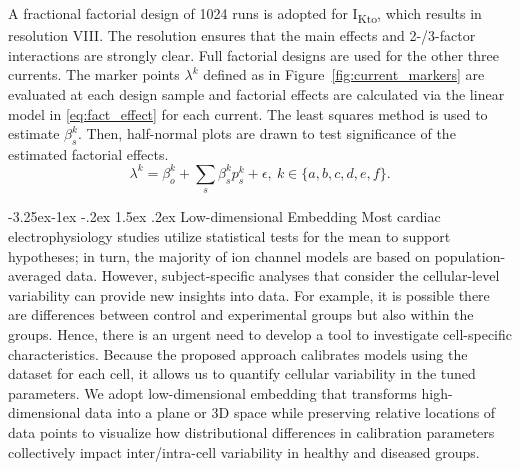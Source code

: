 \documentclass[11pt]{article}
\makeatletter
\renewcommand\subsection{\@startsection{subsection}{2}{\z@}%
                                     {-3.25ex\@plus -1ex \@minus -.2ex}%
                                     {1.5ex \@plus .2ex}%
                                     {\normalfont\fontfamily{phv}\fontsize{14}{17}\bfseries}}
\makeatother
\begin{document}
A fractional factorial design of 1024 runs is adopted for I\textsubscript{Kto}, which results in resolution VIII. The resolution ensures that the main effects and 2-/3-factor interactions are strongly clear. Full factorial designs are used for the other three currents. The marker points $\lambda^{k}$ defined as in Figure~\ref{fig:current_markers} are evaluated at each design sample and factorial effects are calculated via the linear model in \eqref{eq:fact_effect} for each current. The least squares method is used to estimate $\beta_{s}^{k}$. Then, half-normal plots are drawn to test significance of the estimated factorial effects. 
\begin{equation}
    \label{eq:fact_effect}
    \lambda^{k} = \beta_{o}^{k} + \sum\limits_{s}\beta_{s}^{k}p_{s}^{k} + \epsilon, \ k \in \{a,b,c,d,e,f\}.
\end{equation}

\subsection{Low-dimensional Embedding}
Most cardiac electrophysiology studies utilize statistical tests for the mean to support hypotheses; in turn, the majority of ion channel models are based on population-averaged data. However, subject-specific analyses that consider the cellular-level variability can provide new insights into data. For example, it is possible there are differences between control and experimental groups but also within the groups. Hence, there is an urgent need to develop a tool to investigate cell-specific characteristics. Because the proposed approach calibrates models using the dataset for each cell, it allows us to quantify cellular variability in the tuned parameters. We adopt low-dimensional embedding that transforms high-dimensional data into a plane or 3D space while preserving relative locations of data points to visualize how distributional differences in calibration parameters collectively impact inter/intra-cell variability in healthy and diseased groups.
\end{document}
